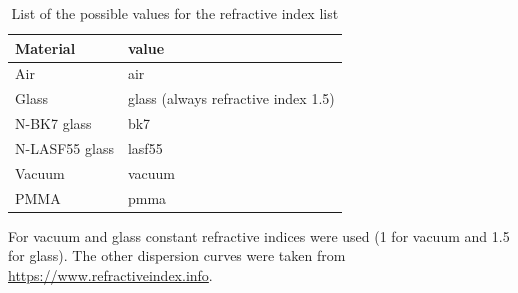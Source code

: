 \documentclass[a4paper,html,11pt,openany]{book}
\begin{document}
 \vspace{1em}
 \begin{center}
 \begin{table}
 \begin{tabular}[H]{l|l}
 Material & value \\
 \hline 
 Air & air \\
 Glass & glass (always refractive index 1.5) \\
 N-BK7 glass & bk7 \\
 N-LASF55 glass & lasf55 \\
 Vacuum & vacuum \\ 
 PMMA & pmma \\
 \end{tabular}  
 \caption{List of the possible values for the refractive index list}
 \label{tab:refractiveIndexList}
\end{table}
 \end{center}
 For vacuum and glass constant refractive indices were used (1 for vacuum and 1.5 for glass). The other dispersion curves were taken from \url{https://www.refractiveindex.info}. 
\end{document}
